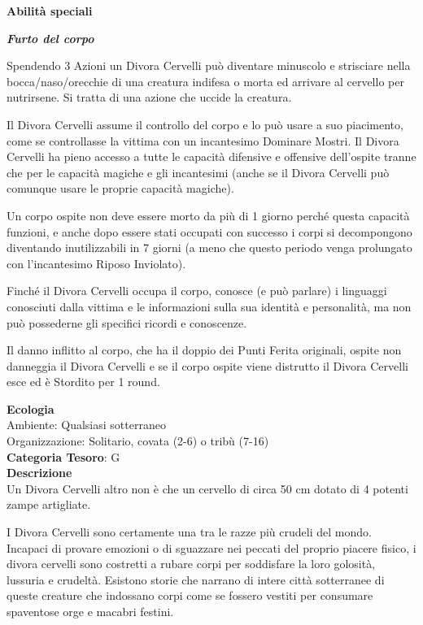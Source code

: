 \begin{multicols}{2}
{\textbf{Abilità speciali}

\emph{\textbf{Furto del corpo}}

Spendendo 3 Azioni un Divora Cervelli può diventare minuscolo e strisciare nella bocca/naso/orecchie di una creatura indifesa o morta ed arrivare al cervello per nutrirsene. Si tratta di una azione che uccide la creatura.

Il Divora Cervelli assume il controllo del corpo e lo può usare a suo piacimento, come se controllasse la vittima con un incantesimo Dominare Mostri. Il Divora Cervelli ha pieno accesso a tutte le capacità difensive e offensive dell'ospite tranne che per le capacità magiche e gli incantesimi (anche se il Divora Cervelli può comunque usare le proprie capacità magiche).

Un corpo ospite non deve essere morto da più di 1 giorno perché questa capacità funzioni, e anche dopo essere stati occupati con successo i corpi si decompongono diventando inutilizzabili in 7 giorni (a meno che questo periodo venga prolungato con l'incantesimo Riposo Inviolato).

Finché il Divora Cervelli occupa il corpo, conosce (e può parlare) i linguaggi conosciuti dalla vittima e le informazioni sulla sua identità e personalità, ma non può possederne gli specifici ricordi e conoscenze.

Il danno inflitto al corpo, che ha il doppio dei Punti Ferita originali, ospite non danneggia il Divora Cervelli e se il corpo ospite viene distrutto il Divora Cervelli esce ed è Stordito per 1 round.

\textbf{Ecologia}\\
Ambiente: Qualsiasi sotterraneo\\
Organizzazione: Solitario, covata (2-6) o tribù (7-16)\\
\textbf{Categoria Tesoro}: G\\
\textbf{Descrizione}\\
Un Divora Cervelli altro non è che un cervello di circa 50 cm dotato di 4 potenti zampe artigliate.

I Divora Cervelli sono certamente una tra le razze più crudeli del mondo. Incapaci di provare emozioni o di sguazzare nei peccati del proprio piacere fisico, i divora cervelli sono costretti a rubare corpi per soddisfare la loro golosità, lussuria e crudeltà. Esistono storie che narrano di intere città sotterranee di queste creature che indossano corpi come se fossero vestiti per consumare spaventose orge e macabri festini.

}
\end{multicols}
